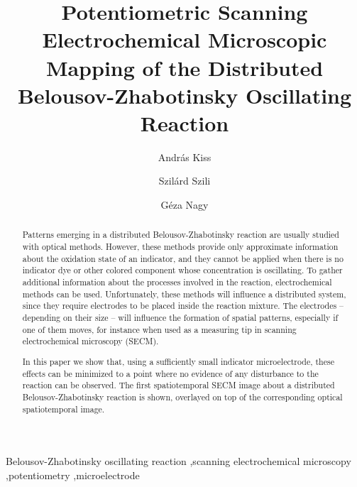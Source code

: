 \documentclass[3p, twocolumn]{elsarticle}
\begin{document}
\begin{frontmatter}

\title{Potentiometric Scanning Electrochemical Microscopic Mapping of the Distributed Belousov-Zhabotinsky Oscillating Reaction}
\author[akiss]{András Kiss}
\author[szszilard]{Szilárd Szili}
\address[akiss, gnagy, szszilard]{Department of General and Physical Chemistry, Faculty of Sciences, University of Pécs, 7624 Pécs, Ifjúság útja 6, Hungary}
\author[gnagy]{Géza Nagy}


\begin{abstract}

Patterns emerging in a distributed Belousov-Zhabotinsky reaction are usually studied with optical methods.
However, these methods provide only approximate information about the oxidation state of an indicator, and they cannot be applied when there is no indicator dye or other colored component whose concentration is oscillating.
To gather additional information about the processes involved in the reaction, electrochemical methods can be used.
Unfortunately, these methods will influence a distributed system, since they require electrodes to be placed inside the reaction mixture.
The electrodes -- depending on their size -- will influence the formation of spatial patterns, especially if one of them moves, for instance when used as a measuring tip in scanning electrochemical microscopy (SECM).

In this paper we show that, using a sufficiently small indicator microelectrode, these effects can be minimized to a point where no evidence of any disturbance to the reaction can be observed.
The first spatiotemporal SECM image about a distributed Belousov-Zhabotinsky reaction is shown, overlayed on top of the corresponding optical spatiotemporal image.

\end{abstract}
\begin{keyword}
	Belousov-Zhabotinsky oscillating reaction \sep scanning electrochemical microscopy \sep potentiometry \sep microelectrode
\end{keyword}
\end{frontmatter}
\end{document}
